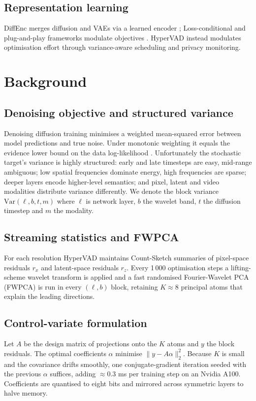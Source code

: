 \documentclass{article}
\begin{document}
\subsection{Representation learning}
DiffEnc merges diffusion and VAEs via a learned encoder \cite{nielsen-2023-diffenc}; Loss-conditional and plug-and-play frameworks modulate objectives \cite{author-year-loss,author-year-you}. HyperVAD instead modulates optimisation effort through variance-aware scheduling and privacy monitoring.

\section{Background}
\subsection{Denoising objective and structured variance}
Denoising diffusion training minimises a weighted mean-squared error between model predictions and true noise. Under monotonic weighting it equals the evidence lower bound on the data log-likelihood \cite{kingma-2023-understanding}. Unfortunately the stochastic target's variance is highly structured: early and late timesteps are easy, mid-range ambiguous; low spatial frequencies dominate energy, high frequencies are sparse; deeper layers encode higher-level semantics; and pixel, latent and video modalities distribute variance differently. We denote the block variance $\mathrm{Var}(\ell, b, t, m)$ where $\ell$ is network layer, $b$ the wavelet band, $t$ the diffusion timestep and $m$ the modality.

\subsection{Streaming statistics and FWPCA}
For each resolution HyperVAD maintains Count-Sketch summaries of pixel-space residuals $r_x$ and latent-space residuals $r_z$. Every 1\,000 optimisation steps a lifting-scheme wavelet transform is applied and a fast randomised Fourier-Wavelet PCA (FWPCA) is run in every $(\ell, b)$ block, retaining $K\approx 8$ principal atoms that explain the leading directions.

\subsection{Control-variate formulation}
Let $A$ be the design matrix of projections onto the $K$ atoms and $y$ the block residuals. The optimal coefficients $\alpha$ minimise $\lVert y - A\alpha \rVert_2^2$. Because $K$ is small and the covariance drifts smoothly, one conjugate-gradient iteration seeded with the previous $\alpha$ suffices, adding $\approx 0.3$ ms per training step on an Nvidia A100. Coefficients are quantised to eight bits and mirrored across symmetric layers to halve memory.
\end{document}
